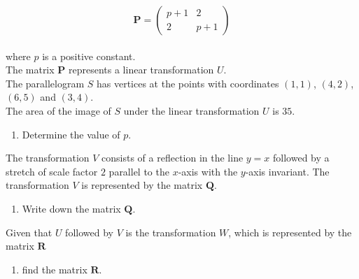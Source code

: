 \documentclass[leqno]{article}
\begin{document}
\begin{enumerate}[
  label=\textbf{\arabic*.},
  leftmargin=*,
  topsep=0pt,
  partopsep=0pt,
  parsep=0pt
]
\[
\mathbf{P}=\begin{pmatrix} p+1 & 2 \\ 2 & p+1 \end{pmatrix}
\] \\
where $p$ is a positive constant. \\

The matrix $\mathbf{P}$ represents a linear transformation $U$. \\
The parallelogram $S$ has vertices at the points with coordinates $(1,1)$, $(4,2)$, $(6,5)$ and $(3,4)$. \\
The area of the image of $S$ under the linear transformation $U$ is $35$. \\

\begin{enumerate}[label=\textbf{(\alph*)}]
  \item Determine the value of $p$.  \\
\end{enumerate}

The transformation $V$ consists of a reflection in the line $y=x$ followed by a stretch of scale factor $2$ parallel to the $x$-axis with the $y$-axis invariant. The transformation $V$ is represented by the matrix $\mathbf{Q}$. \\

\begin{enumerate}[label=\textbf{(\alph*)}, resume]
  \item Write down the matrix $\mathbf{Q}$.  \\
\end{enumerate}

Given that $U$ followed by $V$ is the transformation $W$, which is represented by the matrix $\mathbf{R}$ \\

\begin{enumerate}[label=\textbf{(\alph*)}, resume]
  \item find the matrix $\mathbf{R}$.  \\
\end{enumerate}

\vspace*{10pt}


\end{enumerate}
\end{document}
